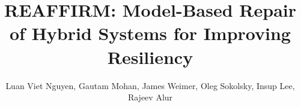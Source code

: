 \documentclass[sigconf]{acmart}
\begin{document}






%
\title{REAFFIRM: Model-Based Repair of Hybrid Systems for Improving Resiliency}
%
\author{Luan Viet Nguyen, Gautam Mohan, James Weimer, Oleg Sokolsky, Insup Lee, Rajeev Alur\\}

\end{document}
